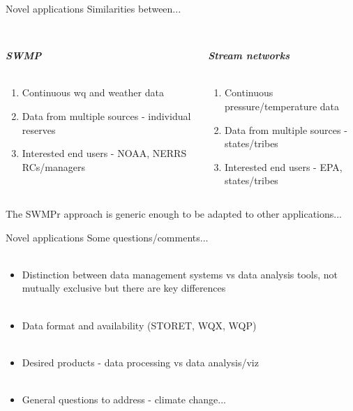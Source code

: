\documentclass[serif]{beamer}\usepackage[]{graphicx}\usepackage[]{color}
\newcommand{\Bigtxt}[1]{\textbf{\textit{#1}}}
\begin{document}
\begin{frame}{Novel applications}
Similarities between... \\~\\
\begin{columns}[t]
\begin{column}{0.45\textwidth}
\Bigtxt{SWMP}\\~\\
\begin{enumerate}
\item Continuous wq and weather data
\item Data from multiple sources - individual reserves
\item Interested end users - NOAA, NERRS RCs/managers
\end{enumerate}
\end{column}
\begin{column}{0.45\textwidth}
\Bigtxt{Stream networks} \\~\\
\begin{enumerate}
\item Continuous pressure/temperature data
\item Data from multiple sources - states/tribes
\item Interested end users - EPA, states/tribes
\end{enumerate}
\end{column}
\end{columns}
\vspace{0.3in}
The SWMPr approach is generic enough to be adapted to other applications...
\end{frame}

\begin{frame}{Novel applications}
Some questions/comments... \\~\\
\begin{itemize}
\item Distinction between data management systems vs data analysis tools, not mutually exclusive but there are key differences \\~\\
\item Data format and availability (STORET, WQX, WQP) \\~\\
\item Desired products - data processing vs data analysis/viz \\~\\
\item General questions to address - climate change...
\end{itemize}

\end{frame}
\end{document}
